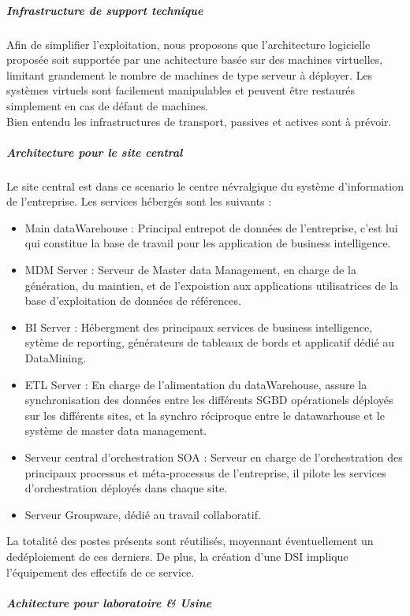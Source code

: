 \subparagraph{Infrastructure de support technique}
Afin de simplifier l'exploitation, nous proposons que l'architecture logicielle proposée soit supportée par une achitecture basée sur des machines virtuelles, limitant grandement le nombre de machines de type serveur à déployer.
Les systèmes virtuels sont facilement manipulables et peuvent être restaurés simplement en cas de défaut de machines.\\
Bien entendu les infrastructures de transport, passives et actives sont à prévoir.

\subparagraph{Architecture pour le site central}

Le site central est dans ce scenario le centre névralgique du système d'information de l'entreprise. Les services hébergés sont les suivants :\\

\begin{itemize}
\item Main dataWarehouse : Principal entrepot de données de l'entreprise, c'est lui qui constitue la base de travail pour les application de business intelligence.
\item MDM Server :  Serveur de Master data Management, en charge de la génération, du maintien, et de l'expoistion aux applications utilisatrices de la base d'exploitation de données de références.
\item BI Server : Hébergment des principaux services de business intelligence, sytème de reporting, générateurs de tableaux de bords et applicatif dédié au DataMining.
\item ETL Server : En charge de l'alimentation du dataWarehouse, assure la synchronisation des données entre les différents SGBD opérationels déployés sur les différents sites, et la synchro réciproque entre le datawarhouse et le système de master data management.
\item Serveur central d'orchestration SOA : Serveur en charge de l'orchestration des principaux processus et méta-processus de l'entreprise, il pilote les services d'orchestration déployés dans chaque site.
\item Serveur Groupware, dédié au travail collaboratif.
\end{itemize}

La totalité des postes présents sont réutilisés, moyennant éventuellement un dedéploiement de ces derniers. De plus, la création d'une DSI implique l'équipement des effectifs de ce service.

\subparagraph{Achitecture pour laboratoire & Usine}

